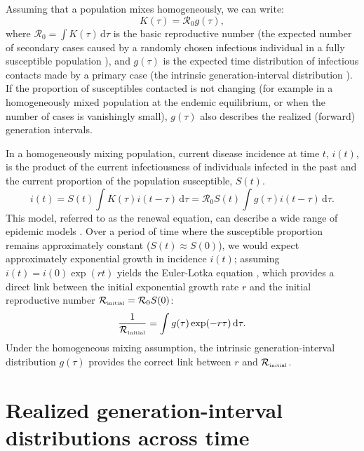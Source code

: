 \documentclass[12pt]{article}
\newcommand{\Rx}[1]{\ensuremath{{\mathcal R}_{#1}}\xspace}
\newcommand{\Ro}{\Rx{0}}
\newcommand{\RR}{\ensuremath{{\mathcal R}}}
\newcommand{\Rini}{\Rx{\textrm{\tiny initial}}}
\begin{document}
Assuming that a population mixes homogeneously, we can write: 
\begin{equation}
K(\tau) = \RR_0 g(\tau),
\end{equation}
where $\RR_0 = \int K(\tau)\,\mathrm{d}\tau$ is the basic reproductive number (the expected number of secondary cases caused by a randomly chosen infectious individual in a fully susceptible population \citep{anderson1991infectious}), 
and $g(\tau)$ is the expected time distribution of infectious contacts made by a primary case (the intrinsic generation-interval distribution \citep{champredon2015intrinsic}).
If the proportion of susceptibles contacted is not changing (for example in a homogeneously mixed population at the endemic equilibrium, or when the number of cases is vanishingly small), $g(\tau)$ also describes the realized (forward) generation intervals.

In a homogeneously mixing population, current disease incidence at time $t$, $i(t)$, is the product of the current infectiousness of individuals infected in the past and the current proportion of the population susceptible, $S(t)$.
\begin{equation}
i(t) = S(t) \int K(\tau) i(t-\tau)\,\mathrm{d}\tau = \RR_0 S(t) \int g(\tau) i(t-\tau)\,\mathrm{d}\tau.
\end{equation}
This model, referred to as the renewal equation, can describe a wide range of epidemic models \citep{roberts2007model, wallinga2007generation, heesterbeek1996concept, diekmann2000mathematical, roberts2004modelling, aldis2005integral, Champredon2018equivalence}.
Over a period of time where the susceptible proportion remains approximately constant ($S(t) \approx S(0)$), we would expect approximately exponential growth in incidence $i(t)$; assuming $i(t) = i(0) \exp(r t)$ yields the Euler-Lotka equation \citep{lotka1907relation}, which provides a direct link between the initial exponential growth rate $r$ and the initial reproductive number $\Rini = \Ro S(0)$:
\begin{equation}
\frac{1}{\Rini} = \int g(\tau) \exp(-r \tau)\,\mathrm{d}\tau.
\label{eq:euler}
\end{equation}
Under the homogeneous mixing assumption, the intrinsic generation-interval distribution $g(\tau)$ provides the correct link between $r$ and $\Rini$.

\section{Realized generation-interval distributions across time}
\end{document}
